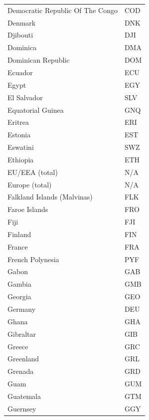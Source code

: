 \documentclass{report}
\begin{document}
\begin{center}
\begin{minipage}{0.46\textwidth}
\begin{tabular}{|p{10.5em}|p{6em}|}
            Democratic Republic Of The Congo & COD\\
            Denmark & DNK\\
            Djibouti & DJI\\
            Dominica & DMA\\
            Dominican Republic & DOM\\
            Ecuador & ECU\\
            Egypt & EGY\\
            El Salvador & SLV\\
            Equatorial Guinea & GNQ\\
            Eritrea & ERI\\
            Estonia & EST\\
            Eswatini & SWZ\\
            Ethiopia & ETH\\
            EU/EEA (total) & N/A\\
            Europe (total) & N/A\\
            Falkland Islands (Malvinas) & FLK\\
            Faroe Islands & FRO\\
            Fiji & FJI\\
            Finland & FIN\\
            France & FRA\\
            French Polynesia & PYF\\
            Gabon & GAB\\
            Gambia & GMB\\
            Georgia & GEO\\
            Germany & DEU\\
            Ghana & GHA\\
            Gibraltar & GIB\\
            Greece & GRC\\
            Greenland & GRL\\
            Grenada & GRD\\
            Guam & GUM\\
            Guatemala & GTM\\
            Guernsey & GGY\\
            \hline
        \end{tabular}
    \end{minipage}


\end{center}
\end{document}
